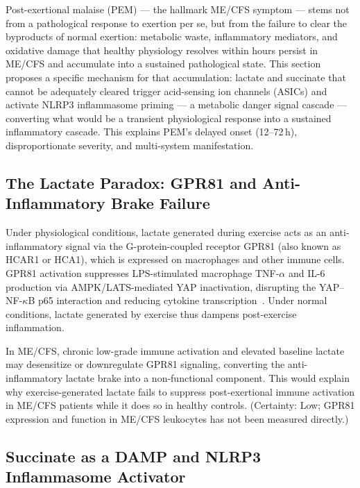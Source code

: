 Post-exertional malaise (PEM) --- the hallmark ME/CFS symptom --- stems not from a pathological response to exertion per se, but from the failure to clear the byproducts of normal exertion: metabolic waste, inflammatory mediators, and oxidative damage that healthy physiology resolves within hours persist in ME/CFS and accumulate into a sustained pathological state. This section proposes a specific mechanism for that accumulation: lactate and succinate that cannot be adequately cleared trigger acid-sensing ion channels (ASICs) and activate NLRP3 inflammasome priming --- a metabolic danger signal cascade --- converting what would be a transient physiological response into a sustained inflammatory cascade. This explains PEM's delayed onset (12--72\,h), disproportionate severity, and multi-system manifestation.

\subsection{The Lactate Paradox: GPR81 and Anti-Inflammatory Brake Failure}

Under physiological conditions, lactate generated during exercise acts as an anti-inflammatory signal via the G-protein-coupled receptor GPR81 (also known as HCAR1 or HCA1), which is expressed on macrophages and other immune cells. GPR81 activation suppresses LPS-stimulated macrophage TNF-$\alpha$ and IL-6 production via AMPK/LATS-mediated YAP inactivation, disrupting the YAP--NF-$\kappa$B p65 interaction and reducing cytokine transcription~\cite{Yang2020GPR81}. Under normal conditions, lactate generated by exercise thus dampens post-exercise inflammation.

\begin{speculation}
\label{spec:ch15-gpr81-desensitization}
In ME/CFS, chronic low-grade immune activation and elevated baseline lactate may desensitize or downregulate GPR81 signaling, converting the anti-inflammatory lactate brake into a non-functional component. This would explain why exercise-generated lactate fails to suppress post-exertional immune activation in ME/CFS patients while it does so in healthy controls. (Certainty: Low; GPR81 expression and function in ME/CFS leukocytes has not been measured directly.)
\end{speculation}

\subsection{Succinate as a DAMP and NLRP3 Inflammasome Activator}

